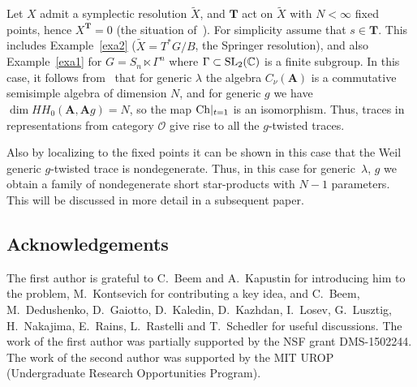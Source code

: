 \documentclass[pdftex]{sigma}
\numberwithin{equation}{section}
\begin{document}
\begin{Example} Let $X$ admit a symplectic resolution $\widetilde{X}$, and ${\mathbf T}$ act on $\widetilde{X}$ with $N<\infty$ fixed points, hence $X^{{\mathbf T}}=0$ (the situation of~\cite{BLPW}). For simplicity assume that $s\in {\mathbf T}$.
This includes Example~\ref{exa2} ($\widetilde X=T^*G/B$, the Springer resolution),
and also Example~\ref{exa1} for $G=S_n\ltimes \Gamma^n$ where $\Gamma\subset {\rm SL}_2({\mathbb C})$ is a finite subgroup. In this case, it follows from~\cite{BLPW} that for generic $\lambda$ the algebra $C_\nu({\mathbf A})$ is a commutative semisimple algebra of dimension $N$, and for generic $g$ we have $\dim HH_0({\mathbf A},{\mathbf A} g)=N$, so the map ${\rm Ch}|_{t=1}$ is an isomorphism. Thus, traces in representations from category $\mathcal{O}$ give rise to all the $g$-twisted traces.

Also by localizing to the fixed points it can be shown in this case that the Weil generic $g$-twisted trace is nondegenerate. Thus, in this case for generic~$\lambda$, $g$ we obtain a family of nondegenerate short star-products with $N-1$ parameters. This will be discussed in more detail in a subsequent paper.
\end{Example}

\subsection*{Acknowledgements} The first author is grateful to C.~Beem and A.~Kapustin for introducing him to the problem, M.~Kontsevich for contributing a key idea, and C.~Beem, M.~Dedushenko, D.~Gaiotto, D.~Kaledin, D.~Kazhdan, I.~Losev, G.~Lusztig, H.~Nakajima, E.~Rains, L.~Rastelli and T.~Schedler for useful discussions. The work of the first author was partially supported by the NSF grant DMS-1502244.
The work of the second author was supported by the MIT UROP (Undergraduate Research Opportunities Program).
\end{document}
